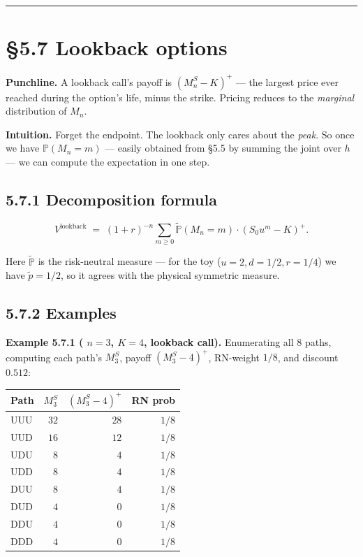 \documentclass[
  10pt,
  twoside]{book}
\newcounter{none} %
\begin{document}
\begin{center}\rule{0.5\linewidth}{0.5pt}\end{center}

\section{§5.7 Lookback options}\label{lookback-options}

\textbf{Punchline.} A lookback call's payoff is \((M^S_n - K)^+\) ---
the largest price ever reached during the option's life, minus the
strike. Pricing reduces to the \emph{marginal} distribution of \(M_n\).

\textbf{Intuition.} Forget the endpoint. The lookback only cares about
the \emph{peak}. So once we have \(\mathbb P(M_n = m)\) --- easily
obtained from §5.5 by summing the joint over \(h\) --- we can compute
the expectation in one step.

\subsection{5.7.1 Decomposition formula}\label{decomposition-formula}

\[V^{\text{lookback}} \;=\; (1+r)^{-n}\sum_{m \ge 0} \tilde{\mathbb P}(M_n = m) \cdot (S_0 u^m - K)^+.\]

Here \(\tilde{\mathbb P}\) is the risk-neutral measure --- for the toy
(\(u = 2, d = 1/2, r = 1/4\)) we have \(\tilde p = 1/2\), so it agrees
with the physical symmetric measure.

\subsection{5.7.2 Examples}\label{examples-27}

\textbf{Example 5.7.1 ( \(n = 3\), \(K = 4\), lookback call).}
Enumerating all 8 paths, computing each path's \(M^S_3\), payoff
\((M^S_3 - 4)^+\), RN-weight \(1/8\), and discount \(0.512\):

{\def\LTcaptype{none} %
\begin{table}[H]
\centering
\begin{tabular}{|l|r|r|r|}
\toprule
Path & \(M^S_3\) & \((M^S_3 - 4)^+\) & RN prob \\
\midrule



UUU & \(32\) & \(28\) & \(1/8\) \\
UUD & \(16\) & \(12\) & \(1/8\) \\
UDU & \(8\) & \(4\) & \(1/8\) \\
UDD & \(8\) & \(4\) & \(1/8\) \\
DUU & \(8\) & \(4\) & \(1/8\) \\
DUD & \(4\) & \(0\) & \(1/8\) \\
DDU & \(4\) & \(0\) & \(1/8\) \\
DDD & \(4\) & \(0\) & \(1/8\) \\
\bottomrule
\end{tabular}
\end{table}
}
\end{document}
